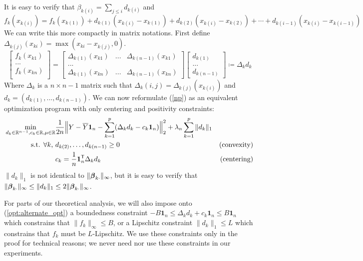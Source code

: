 It is easy to verify that $\beta_{k(i)} = \sum_{j \leq i} d_{k(i)}$ and 
\[
f_k(x_{k(i)}) = f_k({x_{k(1)}}) +d_{k(1)} ( x_{k(i)}
- x_{k(1)}) + d_{k(2)} ( x_{k(i)} - x_{k(2)}) + \cdots + d_{k(i-1)} ( x_{k(i)} - x_{k(i-1)})
\]
We can write this more compactly in matrix notations. First define $\Delta_{k(j)}(x_{ki}) = \max( x_{ki} - x_{k(j)}, 0)$. 
\[
\left[ \begin{array}{c}
    f_k(x_{k1}) \\
    ... \\
    f_k(x_{kn}) \\
\end{array} \right] =
\left[ \begin{array}{ccc}
    \Delta_{k(1)}(x_{k1}) & ... & \Delta_{k(n-1)}(x_{k1}) \\
    ... & & \\
    \Delta_{k(1)}(x_{kn}) & ... & \Delta_{k(n-1)}(x_{kn}) 
\end{array} \right]
\left[ \begin{array}{c}
    d_{k(1)} \\
    ... \\
    d_{k(n-1)}
\end{array} \right] \coloneqq \Delta_k d_k
\]
Where $\Delta_k$ is a $n\times n-1$ matrix such that $\Delta_k(i,j) = \Delta_{k(j)}(x_{k(i)})$ and $d_k = (d_{k(1)} ,..., d_{k(n-1)})$. We can now reformulate (\ref{np}) as an equivalent optimization program with only centering and positivity constraints:
\begin{align}
\min_{d_k \in \mathbb{R}^{n-1}, c_k \in \mathbb{R},\mu \in \mathbb{R}}& \frac{1}{2n} 
       \Bigl\| Y - \overline{Y}\mbox{\boldmath $1$}_n - \sum_{k=1}^p ( \Delta_k d_k - c_k \mbox{\boldmath $1$}_n) \Bigr\|_2^2 
               + \lambda_n \sum_{k=1}^p \|d_k\|_1  & \label{opt:alternate_opt} \\
\textrm{s.t. $\forall k$, }  & d_{k(2)}, \ldots , d_{k(n-1)} \geq 0 	
               \qquad &\textrm{(convexity)} \nonumber \\ 
	& c_k = \frac{1}{n} \mbox{\boldmath $1$}_n^{\mathsf{T}} \Delta_k d_k 	
               \qquad &\textrm{(centering)} \nonumber 
\end{align}
$\|d_k\|_1$ is not identical to $\|\boldsymbol{\beta}_{k\cdot}\|_{\infty}$, but it is easy to verify that $\|\boldsymbol{\beta}_{k\cdot}\|_{\infty} \leq \|d_k\|_1 \leq 2\|\boldsymbol{\beta}_{k\cdot}\|_{\infty}$.

\begin{remark}
\label{rem:bounded_lipschitz_constraints}
For parts of our theoretical analysis, we will also impose onto (\ref{opt:alternate_opt}) a boundedness constraint $-B \mathbf{1}_n \leq \Delta_k d_k + c_k \mathbf{1}_n \leq B \mathbf{1}_n$ which constrains that $\|f_k \|_\infty \leq B$, or a Lipschitz constraint $\|d_k\|_1 \leq L$ which constrains that $f_k$ must be $L$-Lipschitz. We use these constraints only in the proof for technical reasons; we never need nor use these constraints in our experiments.
\end{remark}


